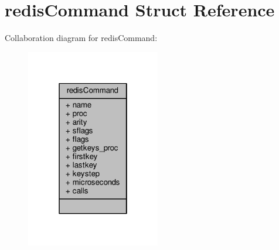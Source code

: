 \hypertarget{structredisCommand}{}\section{redis\+Command Struct Reference}
\label{structredisCommand}


Collaboration diagram for redis\+Command\+:\nopagebreak
\begin{figure}[H]
\begin{center}
\leavevmode
\includegraphics[width=166pt]{structredisCommand__coll__graph}
\end{center}
\end{figure}

